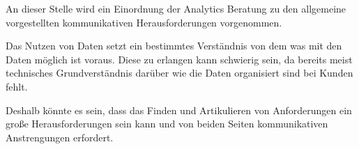 \documentclass[../main.tex]{subfiles}
\begin{document}
An dieser Stelle wird ein Einordnung der Analytics Beratung zu den allgemeine vorgestellten kommunikativen Herausforderungen vorgenommen.

Das Nutzen von Daten setzt ein bestimmtes Verständnis von dem was mit den Daten möglich ist voraus.
Diese zu erlangen kann schwierig sein, da bereits meist technisches Grundverständnis darüber wie die Daten organisiert sind bei Kunden fehlt.
\autocite{tsai2015big}

Deshalb könnte es sein, dass das Finden und Artikulieren von Anforderungen ein große Herausforderungen sein kann und von beiden Seiten kommunikativen Anstrengungen erfordert.
\end{document}
